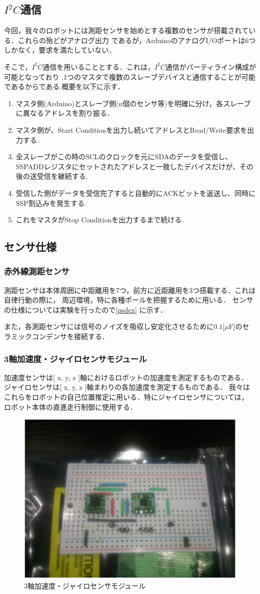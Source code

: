 \subsection{$I^2 C$通信}
今回，我々のロボットには測距センサを始めとする複数のセンサが搭載されている．これらの殆どがアナログ出力
であるが，ArduinoのアナログI/Oポートは6つしかなく，要求を満たしていない．

そこで，$I^2 C$通信を用いることとする．これは，$I^2 C$通信がパーティライン構成が可能となっており
,1つのマスタで複数のスレーブデバイスと通信することが可能であるからである.概要を以下に示す．
\begin{enumerate}
 \item マスタ側(Arduino)とスレーブ側(n個のセンサ等)を明確に分け，各スレーブに異なるアドレスを割り振る．
 \item マスタ側が、Start Conditionを出力し続いてアドレスとRead/Write要求を出力する.
 \item 全スレーブがこの時のSCLのクロックを元にSDAのデータを受信し、SSPADDレジスタにセットされたアドレスと一致したデバイスだけが、その後の送受信を継続する.
 \item 受信した側がデータを受信完了すると自動的にACKビットを返送し、同時にSSP割込みを発生する.
 \item これをマスタがStop Conditionを出力するまで続ける.
\end{enumerate}

\subsection{センサ仕様}
\subsubsection{赤外線測距センサ}  
測距センサは本体周囲に中距離用を7つ，前方に近距離用を3つ搭載する．これは自律行動の際に，
周辺環境，特に各種ポールを把握するために用いる． センサの仕様については実験を行ったので\ref{psdex}
 に示す．

また，各測距センサには信号のノイズを吸収し安定化させるために$0.1[\mu $F]のセラミックコンデンサを接続する．

\subsubsection{3軸加速度・ジャイロセンサモジュール}
加速度センサは[ x, y, z ]軸におけるロボットの加速度を測定するものである．
ジャイロセンサは[ x, y, z ]軸まわりの各加速度を測定するものである．
我々はこれらをロボットの自己位置推定に用いる．特にジャイロセンサについては，
ロボット本体の直進走行制御に使用する．
\begin{figure}[b]
 \centering
 \includegraphics[width=0.4\hsize]{../Circuit/picture/jairo.eps}
 \caption{3軸加速度・ジャイロセンサモジュール}
    \label{jairo}
\end{figure}
